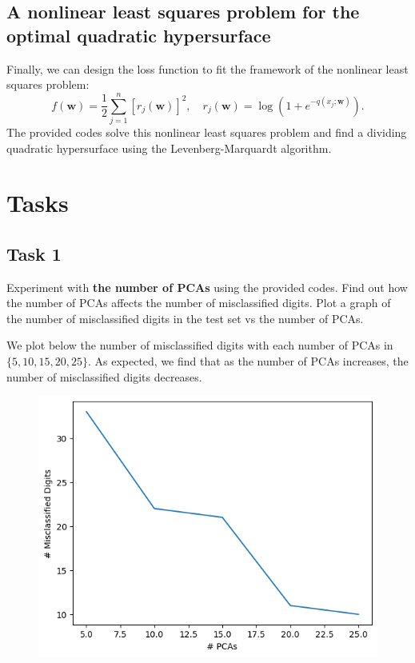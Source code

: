 \documentclass{../kin_math}
\begin{document}
\subsection{A nonlinear least squares problem for the optimal quadratic hypersurface} \label{least_squares}
Finally, we can design the loss function to fit the framework of the nonlinear least squares problem:
\begin{equation}
  f(\textbf{w}) = \frac{1}{2} \sum_{j = 1}^n [r_j(\textbf{w})]^2, \quad r_j(\textbf{w}) = \log\left(1 + e^{-q(x_j; \textbf{w})}\right).
\end{equation}
The provided codes solve this nonlinear least squares problem and find a dividing quadratic hypersurface using the Levenberg-Marquardt algorithm.
\section{Tasks}
\subsection{Task 1}
Experiment with \textbf{the number of PCAs} using the provided codes. Find out how the number of PCAs affects the number of misclassified digits. Plot a graph of the number of misclassified digits in the test set vs the number of PCAs.
\begin{solution}
  We plot below the number of misclassified digits with each number of PCAs in $\{5, 10, 15, 20, 25\}$. As expected, we find that as the number of PCAs increases, the number of misclassified digits decreases.
  \begin{figure}
    \centering
    \includegraphics[scale=0.8]{pca.png}
  \end{figure}
\end{solution}
\end{document}
